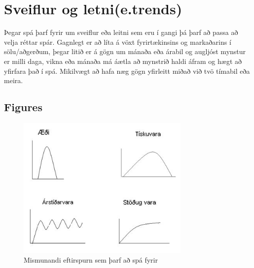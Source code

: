 %
%
%

\section {Sveiflur og letni(e.trends)}
 
Þegar spá þarf fyrir um sveiflur eða leitni sem eru í gangi þá þarf að passa að velja réttar spár. Gagnlegt er að líta á vöxt fyrirtækinsins og markaðarins í sölu/aðgerðum, þegar litið er á gögn um mánaða eða árabil og augljóst mynstur er milli daga, vikna eða mánaða má áætla að mynstrið haldi áfram og hægt að yfirfara það í spá. Mikilvægt að hafa næg gögn yfirleitt miðað við tvö tímabil eða meira.

\subsection{Figures}


\begin{figure}[htb]
\begin{center}

\includegraphics[width=0.75\textwidth]{tegundirspar}
\caption{Mismunandi eftirspurn sem þarf að spá fyrir}
\label{fig:figure1}
\end{center}
\end{figure}

